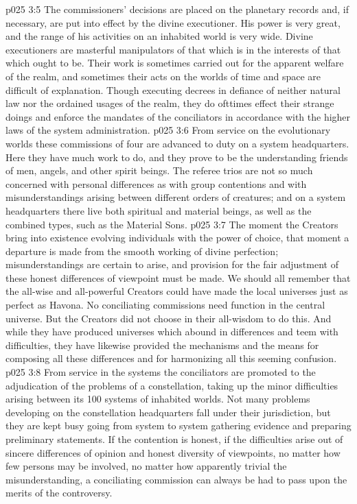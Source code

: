 \vs p025 3:5 The commissioners’ decisions are placed on the planetary records and, if necessary, are put into effect by the divine executioner. His power is very great, and the range of his activities on an inhabited world is very wide. Divine executioners are masterful manipulators of that which is in the interests of that which ought to be. Their work is sometimes carried out for the apparent welfare of the realm, and sometimes their acts on the worlds of time and space are difficult of explanation. Though executing decrees in defiance of neither natural law nor the ordained usages of the realm, they do ofttimes effect their strange doings and enforce the mandates of the conciliators in accordance with the higher laws of the system administration.
\vs p025 3:6 \bibnobreakspace {} From service on the evolutionary worlds these commissions of four are advanced to duty on a system headquarters. Here they have much work to do, and they prove to be the understanding friends of men, angels, and other spirit beings. The referee trios are not so much concerned with personal differences as with group contentions and with misunderstandings arising between different orders of creatures; and on a system headquarters there live both spiritual and material beings, as well as the combined types, such as the Material Sons.
\vs p025 3:7 The moment the Creators bring into existence evolving individuals with the power of choice, that moment a departure is made from the smooth working of divine perfection; misunderstandings are certain to arise, and provision for the fair adjustment of these honest differences of viewpoint must be made. We should all remember that the all\hyp{}wise and all\hyp{}powerful Creators could have made the local universes just as perfect as Havona. No conciliating commissions need function in the central universe. But the Creators did not choose in their all\hyp{}wisdom to do this. And while they have produced universes which abound in differences and teem with difficulties, they have likewise provided the mechanisms and the means for composing all these differences and for harmonizing all this seeming confusion.
\vs p025 3:8 \bibnobreakspace {} From service in the systems the conciliators are promoted to the adjudication of the problems of a constellation, taking up the minor difficulties arising between its 100 systems of inhabited worlds. Not many problems developing on the constellation headquarters fall under their jurisdiction, but they are kept busy going from system to system gathering evidence and preparing preliminary statements. If the contention is honest, if the difficulties arise out of sincere differences of opinion and honest diversity of viewpoints, no matter how few persons may be involved, no matter how apparently trivial the misunderstanding, a conciliating commission can always be had to pass upon the merits of the controversy.
